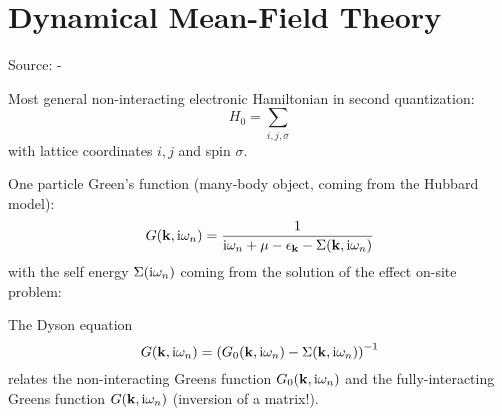 \documentclass[../main.tex]{subfiles}
\begin{document}
\chapter{Dynamical Mean-Field Theory}\label{ch:dynamical-mean-field-theory}

Source: \citeauthor{Georges_Kotliar_Krauth_Rozenberg_1996} -~~\cite{Georges_Kotliar_Krauth_Rozenberg_1996}

Most general non-interacting electronic Hamiltonian in second quantization:
\begin{equation}
    H_0 = \sum_{i, j, \sigma}
\end{equation}
with lattice coordinates \(i, j\) and spin \(\sigma\).

One particle Green's function (many-body object, coming from the Hubbard model):
\begin{equation}
    G(\bm{\mathrm{k}}, \mathrm{i} \omega_n) = \frac{1}{\mathrm{i} \omega_n + \mu - \epsilon_{\bm{\mathrm{k}}} - \Sigma(\bm{\mathrm{k}}, \mathrm{i} \omega_n)}
\end{equation}
with the self energy \(\Sigma(\mathrm{i} \omega_n)\) coming from the solution of the effect on-site problem:

The Dyson equation
\begin{equation}
    G(\bm{\mathrm{k}}, \mathrm{i} \omega_n) = \left( G_0 (\bm{\mathrm{k}}, \mathrm{i} \omega_n) - \Sigma(\bm{\mathrm{k}}, \mathrm{i} \omega_n)\right)^{-1}
\end{equation}
relates the non-interacting Greens function \(G_0 (\bm{\mathrm{k}}, \mathrm{i} \omega_n)\) and the fully-interacting Greens function \(G (\bm{\mathrm{k}}, \mathrm{i} \omega_n)\) (inversion of a matrix!).
\end{document}
